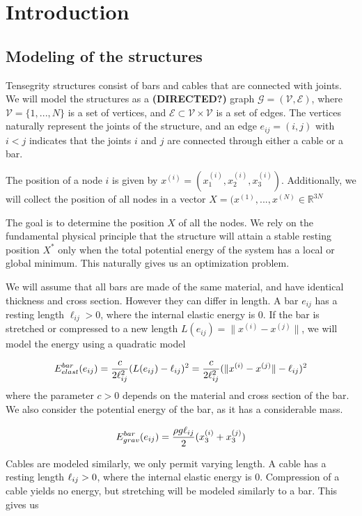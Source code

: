 \section{Introduction}
\subsection{Modeling of the structures}
Tensegrity structures consist of bars and cables that are connected with joints. We will model the structures as a \textbf{(DIRECTED?)} graph $\mathcal{G} = (\mathcal{V},\mathcal{E})$, where $\mathcal{V} = \{1,...,N\}$ is a set of vertices, and $\mathcal{E} \subset \mathcal{V} \times \mathcal{V}$ is a set of edges. The vertices naturally represent the joints of the structure, and an edge $e_{ij} = (i,j)$ with $i < j$ indicates that the joints $i$ and $j$ are connected through either a cable or a bar.

The position of a node $i$ is given by $x^{(i)} = (x_1^{(i)},x_2^{(i)},x_3^{(i)})$. Additionally, we will collect the position of all nodes in a vector $X = (x^{(1)},...,x^{(N)} \in \mathbb{R}^{3N}$

The goal is to determine the position $X$ of all the nodes. We rely on the fundamental physical principle that the structure will attain a stable resting position $X^*$ only when the total potential energy of the system has a local or global minimum. This naturally gives us an optimization problem.

We will assume that all bars are made of the same material, and have identical thickness and cross section. However they can differ in length. A bar $e_{ij}$ has a resting length $\ell_{ij}>0$, where the internal elastic energy is $0$. If the bar is stretched or compressed to a new length $L(e_{ij})=\lVert x^{(i)} - x^{(j)}\rVert$, we will model the energy using a quadratic model


\begin{equation}
    E^{bar}_{elast}(e_{ij}) = \frac{c}{2\ell_{ij}^2}(L(e_{ij}) - \ell_{ij})^2 = \frac{c}{2 \ell_{ij}^2}(\lVert x^{(i)} - x^{(j)}\rVert - \ell_{ij})^2
    \label{barElast}
\end{equation}
where the parameter $c > 0$ depends on the material and cross section of the bar. We also consider the potential energy of the bar, as it has a considerable mass.

\begin{equation}
    E^{bar}_{grav}(e_{ij}) = \frac{\rho g \ell_{ij}}{2}(x_3^{(i)}+x_3^{(j)})
    \label{barGrav}
\end{equation}

Cables are modeled similarly, we only permit varying length. A cable has a resting length $\ell_{ij} > 0$, where the internal elastic energy is $0$. Compression of a cable yields no energy, but stretching will be modeled similarly to a bar. This gives us

